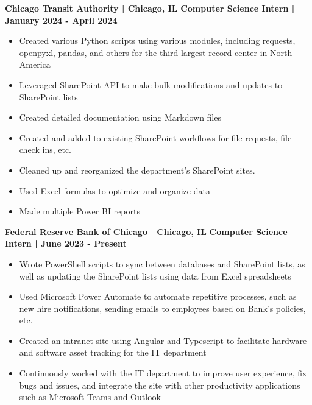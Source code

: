 \documentclass[10pt,letterpaper]{article}
\begin{document}
	\textbf{Chicago Transit Authority | Chicago, IL} \newline
	\textbf{Computer Science Intern | January 2024 - April 2024 }
	\begin{itemize}
		\itemsep -5pt
		\item Created various Python scripts using various modules, including requests, openpyxl, pandas, and others for the third largest record center in North America
		\item Leveraged SharePoint API to make bulk modifications and updates to SharePoint lists
		\item Created detailed documentation using Markdown files
		\item Created and added to existing SharePoint workflows for file requests, file check ins, etc.
		\item Cleaned up and reorganized the department's SharePoint sites.
		\item Used Excel formulas to optimize and organize data 
		\item Made multiple Power BI reports
	\end{itemize}
	
	\textbf{Federal Reserve Bank of Chicago | Chicago, IL} \newline
	\textbf{Computer Science Intern | June 2023 - Present }
	\begin{itemize}
		\itemsep -5pt
		\item Wrote PowerShell scripts to sync between databases and SharePoint lists, as well as updating the SharePoint lists using data from Excel spreadsheets
		\item Used Microsoft Power Automate to automate repetitive processes, such as new hire notifications, sending emails to employees based on Bank's policies, etc.
		\item Created an intranet site using Angular and Typescript to facilitate hardware and software asset tracking for the IT department
		\item Continuously worked with the IT department to improve user experience, fix bugs and issues, and integrate the site with other productivity applications such as Microsoft Teams and Outlook
	\end{itemize}
	
	
\end{document}
